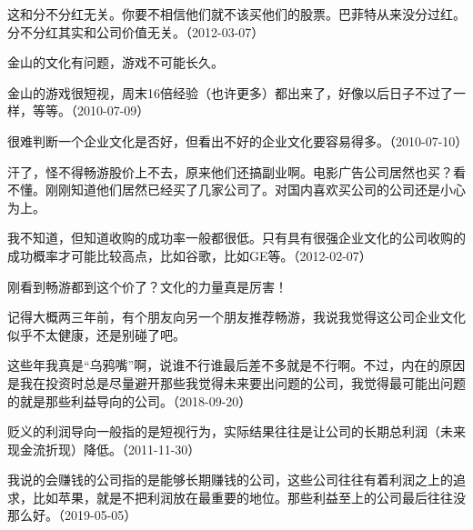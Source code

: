 这和分不分红无关。你要不相信他们就不该买他们的股票。巴菲特从来没分过红。分不分红其实和公司价值无关。（2012-03-07）



金山的文化有问题，游戏不可能长久。


金山的游戏很短视，周末16倍经验（也许更多）都出来了，好像以后日子不过了一样，等等。（2010-07-09）


很难判断一个企业文化是否好，但看出不好的企业文化要容易得多。（2010-07-10）


汗了，怪不得畅游股价上不去，原来他们还搞副业啊。电影广告公司居然也买？看不懂。刚刚知道他们居然已经买了几家公司了。对国内喜欢买公司的公司还是小心为上。


我不知道，但知道收购的成功率一般都很低。只有具有很强企业文化的公司收购的成功概率才可能比较高点，比如谷歌，比如GE等。（2012-02-07）

刚看到畅游都到这个价了？文化的力量真是厉害！

记得大概两三年前，有个朋友向另一个朋友推荐畅游，我说我觉得这公司企业文化似乎不太健康，还是别碰了吧。


这些年我真是“乌鸦嘴”啊，说谁不行谁最后差不多就是不行啊。不过，内在的原因是我在投资时总是尽量避开那些我觉得未来要出问题的公司，我觉得最可能出问题的就是那些利益导向的公司。（2018-09-20）

贬义的利润导向一般指的是短视行为，实际结果往往是让公司的长期总利润（未来现金流折现）降低。（2011-11-30）


我说的会赚钱的公司指的是能够长期赚钱的公司，这些公司往往有着利润之上的追求，比如苹果，就是不把利润放在最重要的地位。那些利益至上的公司最后往往没那么好。（2019-05-05）



